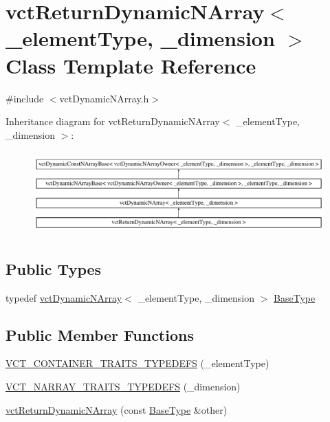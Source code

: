 \hypertarget{classvct_return_dynamic_n_array}{}\section{vct\+Return\+Dynamic\+N\+Array$<$ \+\_\+element\+Type, \+\_\+dimension $>$ Class Template Reference}
\label{classvct_return_dynamic_n_array}


{\ttfamily \#include $<$vct\+Dynamic\+N\+Array.\+h$>$}

Inheritance diagram for vct\+Return\+Dynamic\+N\+Array$<$ \+\_\+element\+Type, \+\_\+dimension $>$\+:\begin{figure}[H]
\begin{center}
\leavevmode
\includegraphics[height=3.241679cm]{df/d40/classvct_return_dynamic_n_array}
\end{center}
\end{figure}
\subsection*{Public Types}
\begin{DoxyCompactItemize}
\item 
typedef \hyperlink{classvct_dynamic_n_array}{vct\+Dynamic\+N\+Array}$<$ \+\_\+element\+Type, \+\_\+dimension $>$ \hyperlink{classvct_return_dynamic_n_array_a35849019078c617ed43b530c49f0cfe8}{Base\+Type}
\end{DoxyCompactItemize}
\subsection*{Public Member Functions}
\begin{DoxyCompactItemize}
\item 
\hyperlink{classvct_return_dynamic_n_array_af1ced98bb6f1bb687abc5a7ea545c9cf}{V\+C\+T\+\_\+\+C\+O\+N\+T\+A\+I\+N\+E\+R\+\_\+\+T\+R\+A\+I\+T\+S\+\_\+\+T\+Y\+P\+E\+D\+E\+F\+S} (\+\_\+element\+Type)
\item 
\hyperlink{classvct_return_dynamic_n_array_ab60fd293ad964352f465fdd1d23732be}{V\+C\+T\+\_\+\+N\+A\+R\+R\+A\+Y\+\_\+\+T\+R\+A\+I\+T\+S\+\_\+\+T\+Y\+P\+E\+D\+E\+F\+S} (\+\_\+dimension)
\item 
\hyperlink{classvct_return_dynamic_n_array_ac52b44fb01166eca1a6b97fe949777fd}{vct\+Return\+Dynamic\+N\+Array} (const \hyperlink{classvct_dynamic_n_array_adc62cbbc97a16fa388dd96d4404fd075}{Base\+Type} \&other)
\end{DoxyCompactItemize}
